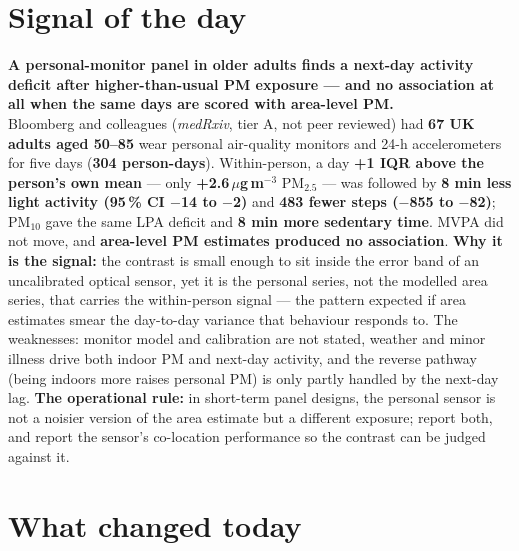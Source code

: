 \documentclass[10pt]{article}
\begin{document}
\vspace{6mm}

\section*{\sffamily\bfseries\color{Deep}Signal of the day}
\vspace{-1.5mm}{\color{Amber}\rule{\linewidth}{1.1pt}}\vspace{2.5mm}

\begin{keybox}
{\sffamily\bfseries\small\color{Deep}A personal-monitor panel in older adults finds a
next-day activity deficit after higher-than-usual PM exposure --- and no association at all when
the same days are scored with area-level PM.}\\[1.4mm]
\footnotesize
Bloomberg and colleagues (\textit{medRxiv}, tier A, not peer reviewed) had \textbf{67 UK adults aged
50--85} wear personal air-quality monitors and 24-h accelerometers for five days (\textbf{304
person-days}). Within-person, a day \textbf{+1 IQR above the person's own mean} --- only
\textbf{+2.6\,$\mu$g\,m$^{-3}$} PM$_{2.5}$ --- was followed by \textbf{8 min less light activity
(95\,\% CI $-$14 to $-$2)} and \textbf{483 fewer steps ($-$855 to $-$82)}; PM$_{10}$ gave the same
LPA deficit and \textbf{8 min more sedentary time}. MVPA did not move, and \textbf{area-level PM
estimates produced no association}. \textbf{Why it is the signal:} the contrast is small enough to
sit inside the error band of an uncalibrated optical sensor, yet it is the personal series, not
the modelled area series, that carries the within-person signal --- the pattern expected if
area estimates smear the day-to-day variance that behaviour responds to. The weaknesses: monitor
model and calibration are not stated, weather and minor illness drive both indoor PM and
next-day activity, and the reverse pathway (being indoors more raises personal PM) is only
partly handled by the next-day lag. \textbf{The operational rule:} in short-term panel designs,
the personal sensor is not a noisier version of the area estimate but a different exposure; report
both, and report the sensor's co-location performance so the contrast can be judged against it.\par
\end{keybox}

\vspace{3mm}

\section*{\sffamily\bfseries\color{Deep}What changed today}
\vspace{-1.5mm}{\color{Amber}\rule{\linewidth}{1.1pt}}\vspace{2.5mm}
\end{document}
